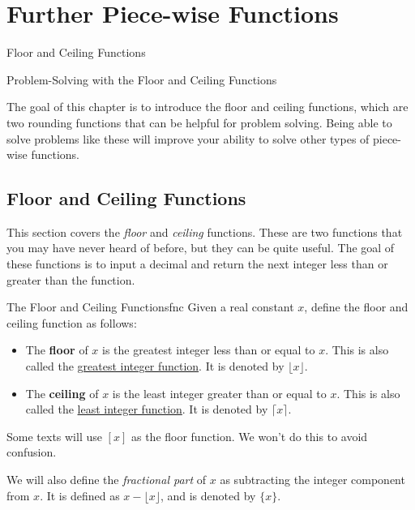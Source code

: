 \documentclass[../book.tex]{subfiles}
\begin{document}
\chapter{Further Piece-wise Functions}
\begin{introduction}[Contents]
\item Floor and Ceiling Functions
\item Problem-Solving with the Floor and Ceiling Functions
\end{introduction}
\noindent The goal of this chapter is to introduce the floor and ceiling functions, which are two rounding functions that can be helpful for problem solving.  Being able to solve problems like these will improve your ability to solve other types of piece-wise functions.
\section{Floor and Ceiling Functions}
\noindent This section covers the \textit{floor} and \textit{ceiling} functions.  These are two functions that you may have never heard of before, but they can be quite useful.  The goal of these functions is to input a decimal and return the next integer less than or greater than the function. 
\begin{definition}{The Floor and Ceiling Functions}{fnc}
Given a real constant $x$, define the floor and ceiling function as follows:\begin{itemize}
    \item The \textbf{floor} of $x$ is the greatest integer less than or equal to $x$.  This is also called the \underline{greatest integer function}.  It is denoted by $\lfloor{x}\rfloor$.
    \item The \textbf{ceiling} of $x$ is the least integer greater than or equal to $x$.  This is also called the \underline{least integer function}.  It is denoted by $\lceil{x}\rceil$.
\end{itemize}
\end{definition}
\begin{remark}
Some texts will use $[x]$ as the floor function.  We won't do this to avoid confusion.
\end{remark}
We will also define the \textit{fractional part} of $x$ as subtracting the integer component from $x$.  It is defined as $x-\lfloor{x}\rfloor$, and is denoted by $\{x\}$.
\end{document}

